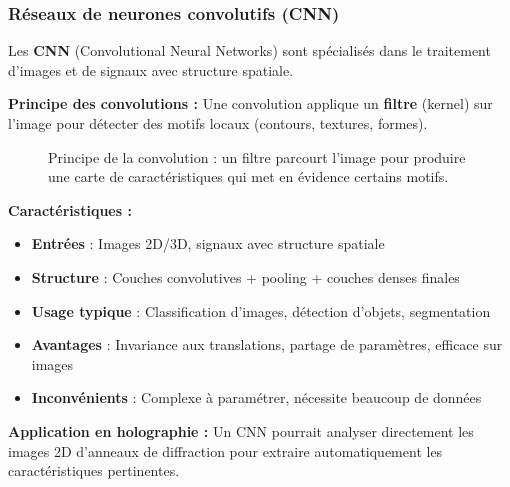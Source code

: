 \documentclass[11pt,a4paper,twocolumn]{article}
\begin{document}
\subsubsection{Réseaux de neurones convolutifs (CNN)}

Les \textbf{CNN} (Convolutional Neural Networks) sont spécialisés dans le traitement d'images et de signaux avec structure spatiale.

\textbf{Principe des convolutions :}
Une convolution applique un \textbf{filtre} (kernel) sur l'image pour détecter des motifs locaux (contours, textures, formes).

\begin{figure}[h]
\centering
{}
\caption{Principe de la convolution : un filtre parcourt l'image pour produire une carte de caractéristiques qui met en évidence certains motifs.}
\label{fig:convolution}
\end{figure}

\textbf{Caractéristiques :}
\begin{itemize}
    \item \textbf{Entrées} : Images 2D/3D, signaux avec structure spatiale
    \item \textbf{Structure} : Couches convolutives + pooling + couches denses finales
    \item \textbf{Usage typique} : Classification d'images, détection d'objets, segmentation
    \item \textbf{Avantages} : Invariance aux translations, partage de paramètres, efficace sur images
    \item \textbf{Inconvénients} : Complexe à paramétrer, nécessite beaucoup de données
\end{itemize}

\textbf{Application en holographie :} Un CNN pourrait analyser directement les images 2D d'anneaux de diffraction pour extraire automatiquement les caractéristiques pertinentes.
\end{document}
